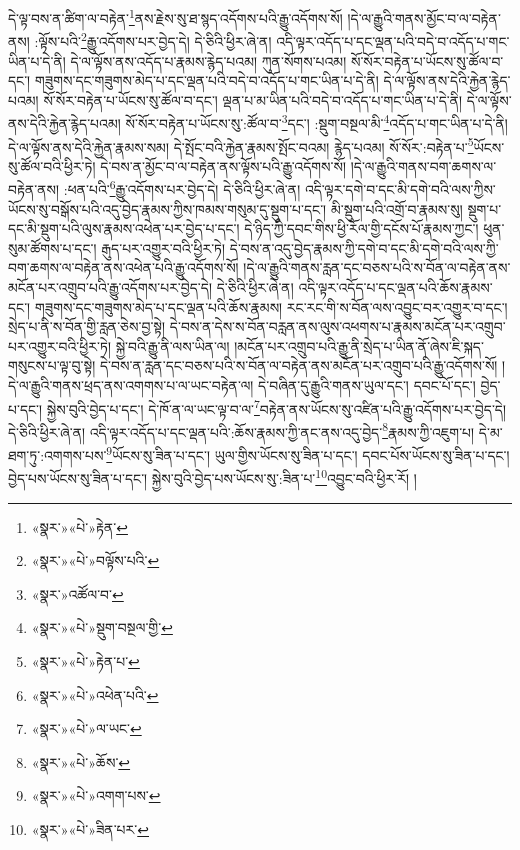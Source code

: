 དེ་ལྟ་བས་ན་ཚིག་ལ་བརྟེན་\footnote{«སྣར་»«པེ་»རྟེན་}ནས་རྗེས་སུ་ཐ་སྙད་འདོགས་པའི་རྒྱུ་འདོགས་སོ། །དེ་ལ་རྒྱུའི་གནས་མྱོང་བ་ལ་བརྟེན་ནས། :ལྟོས་པའི་\footnote{«སྣར་»«པེ་»བལྟོས་པའི་}རྒྱུ་འདོགས་པར་བྱེད་དེ། དེ་ཅིའི་ཕྱིར་ཞེ་ན། འདི་ལྟར་འདོད་པ་དང་ལྡན་པའི་བདེ་བ་འདོད་པ་གང་ཡིན་པ་དེ་ནི། དེ་ལ་ལྟོས་ནས་འདོད་པ་རྣམས་རྙེད་པའམ། ཀུན་སོགས་པའམ། སོ་སོར་བརྟེན་པ་ཡོངས་སུ་ཚོལ་བ་དང་། གཟུགས་དང་གཟུགས་མེད་པ་དང་ལྡན་པའི་བདེ་བ་འདོད་པ་གང་ཡིན་པ་དེ་ནི། དེ་ལ་ལྟོས་ནས་དེའི་རྐྱེན་རྙེད་པའམ། སོ་སོར་བརྟེན་པ་ཡོངས་སུ་ཚོལ་བ་དང་། ལྡན་པ་མ་ཡིན་པའི་བདེ་བ་འདོད་པ་གང་ཡིན་པ་དེ་ནི། དེ་ལ་ལྟོས་ནས་དེའི་རྐྱེན་རྙེད་པའམ། སོ་སོར་བརྟེན་པ་ཡོངས་སུ་:ཚོལ་བ་\footnote{«སྣར་»འཚོལ་བ་}དང་། :སྡུག་བསྔལ་མི་\footnote{«སྣར་»«པེ་»སྡུག་བསྔལ་གྱི་}འདོད་པ་གང་ཡིན་པ་དེ་ནི། དེ་ལ་ལྟོས་ནས་དེའི་རྐྱེན་རྣམས་སམ། དེ་སྤོང་བའི་རྐྱེན་རྣམས་སྤོང་བའམ། རྙེད་པའམ། སོ་སོར་:བརྟེན་པ་\footnote{«སྣར་»«པེ་»རྟེན་པ་}ཡོངས་སུ་ཚོལ་བའི་ཕྱིར་ཏེ། དེ་བས་ན་མྱོང་བ་ལ་བརྟེན་ནས་ལྟོས་པའི་རྒྱུ་འདོགས་སོ། །དེ་ལ་རྒྱུའི་གནས་བག་ཆགས་ལ་བརྟེན་ནས། :ཕན་པའི་\footnote{«སྣར་»«པེ་»འཕེན་པའི་}རྒྱུ་འདོགས་པར་བྱེད་དེ། དེ་ཅིའི་ཕྱིར་ཞེ་ན། འདི་ལྟར་དགེ་བ་དང་མི་དགེ་བའི་ལས་ཀྱིས་ཡོངས་སུ་བསྒོས་པའི་འདུ་བྱེད་རྣམས་ཀྱིས་ཁམས་གསུམ་དུ་སྡུག་པ་དང་། མི་སྡུག་པའི་འགྲོ་བ་རྣམས་སུ། སྡུག་པ་དང་མི་སྡུག་པའི་ལུས་རྣམས་འཕེན་པར་བྱེད་པ་དང་། དེ་ཉིད་ཀྱི་དབང་གིས་ཕྱི་རོལ་གྱི་དངོས་པོ་རྣམས་ཀྱང་། ཕུན་སུམ་ཚོགས་པ་དང་། རྒུད་པར་འགྱུར་བའི་ཕྱིར་ཏེ། དེ་བས་ན་འདུ་བྱེད་རྣམས་ཀྱི་དགེ་བ་དང་མི་དགེ་བའི་ལས་ཀྱི་བག་ཆགས་ལ་བརྟེན་ནས་འཕེན་པའི་རྒྱུ་འདོགས་སོ། །དེ་ལ་རྒྱུའི་གནས་རླན་དང་བཅས་པའི་ས་བོན་ལ་བརྟེན་ནས་མངོན་པར་འགྲུབ་པའི་རྒྱུ་འདོགས་པར་བྱེད་དེ། དེ་ཅིའི་ཕྱིར་ཞེ་ན། འདི་ལྟར་འདོད་པ་དང་ལྡན་པའི་ཆོས་རྣམས་དང་། གཟུགས་དང་གཟུགས་མེད་པ་དང་ལྡན་པའི་ཆོས་རྣམས། རང་རང་གི་ས་བོན་ལས་འབྱུང་བར་འགྱུར་བ་དང་། སྲེད་པ་ནི་ས་བོན་གྱི་རླན་ཅེས་བྱ་སྟེ། དེ་བས་ན་དེས་ས་བོན་བརླན་ནས་ལུས་འཕགས་པ་རྣམས་མངོན་པར་འགྲུབ་པར་འགྱུར་བའི་ཕྱིར་ཏེ། སྐྱེ་བའི་རྒྱུ་ནི་ལས་ཡིན་ལ། །མངོན་པར་འགྲུབ་པའི་རྒྱུ་ནི་སྲེད་པ་ཡིན་ནོ་ཞེས་ཇི་སྐད་གསུངས་པ་ལྟ་བུ་སྟེ། དེ་བས་ན་རླན་དང་བཅས་པའི་ས་བོན་ལ་བརྟེན་ནས་མངོན་པར་འགྲུབ་པའི་རྒྱུ་འདོགས་སོ། །དེ་ལ་རྒྱུའི་གནས་ཕྲད་ནས་འགགས་པ་ལ་ཡང་བརྟེན་ལ། དེ་བཞིན་དུ་རྒྱུའི་གནས་ཡུལ་དང་། དབང་པོ་དང་། བྱེད་པ་དང་། སྐྱེས་བུའི་བྱེད་པ་དང་། དེ་ཁོ་ན་ལ་ཡང་ལྟ་བ་ལ་\footnote{«སྣར་»«པེ་»ལ་ཡང་}བརྟེན་ནས་ཡོངས་སུ་འཛིན་པའི་རྒྱུ་འདོགས་པར་བྱེད་དེ། དེ་ཅིའི་ཕྱིར་ཞེ་ན། འདི་ལྟར་འདོད་པ་དང་ལྡན་པའི་:ཆོས་རྣམས་ཀྱི་ནང་ནས་འདུ་བྱེད་\footnote{«སྣར་»«པེ་»ཆོས་}རྣམས་ཀྱི་འཇུག་པ། དེ་མ་ཐག་ཏུ་:འགགས་པས་\footnote{«སྣར་»«པེ་»འགག་པས་}ཡོངས་སུ་ཟིན་པ་དང་། ཡུལ་གྱིས་ཡོངས་སུ་ཟིན་པ་དང་། དབང་པོས་ཡོངས་སུ་ཟིན་པ་དང་། བྱེད་པས་ཡོངས་སུ་ཟིན་པ་དང་། སྐྱེས་བུའི་བྱེད་པས་ཡོངས་སུ་:ཟིན་པ་\footnote{«སྣར་»«པེ་»ཟིན་པར་}འབྱུང་བའི་ཕྱིར་རོ། །
